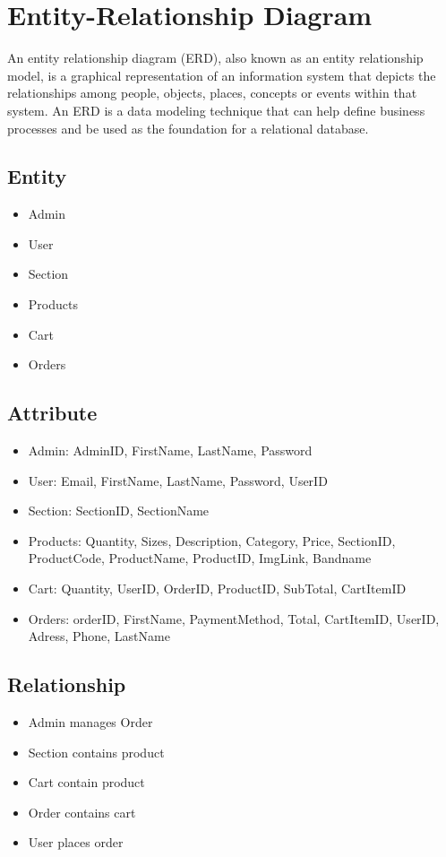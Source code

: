 \section{Entity-Relationship Diagram}
An entity relationship diagram (ERD), also known as an entity relationship model, is a graphical representation of an information system that depicts the relationships among people, objects, places, concepts or events within that system. An ERD is a data modeling technique that can help define business processes and be used as the foundation for a relational database.\\
\subsection{Entity}
\begin{itemize}
\item Admin
\item User
\item Section
\item Products
\item Cart
\item Orders

\end{itemize}
\subsection{Attribute}
\begin{itemize}

\item Admin: AdminID, FirstName, LastName, Password
\item User: Email, FirstName, LastName, Password, UserID 
\item Section: SectionID, SectionName
\item Products: Quantity, Sizes, Description, Category, Price, SectionID, ProductCode, ProductName, ProductID, ImgLink, Bandname

\item Cart: Quantity, UserID, OrderID, ProductID, SubTotal, CartItemID
\item Orders: orderID, FirstName, PaymentMethod, Total, CartItemID, UserID, Adress, Phone, LastName 


\end{itemize}



 \subsection{Relationship}
 \begin{itemize}
  \item Admin manages Order
  \item Section contains product
  \item Cart contain product
  \item Order contains cart
  \item User places order

    \end{itemize}
